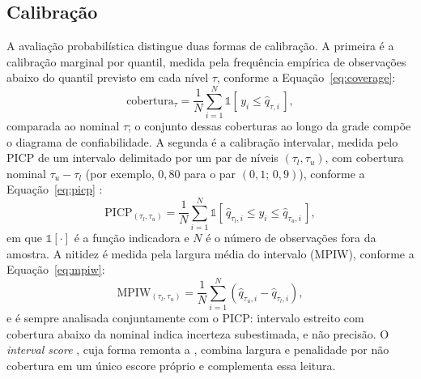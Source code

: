 \subsection{Calibração}
A avaliação probabilística distingue duas formas de calibração. A primeira é a calibração marginal por quantil, medida pela frequência empírica de observações abaixo do quantil previsto em cada nível \(\tau\), conforme a Equação~\ref{eq:coverage}:
\begin{equation}
    \mathrm{cobertura}_{\tau} = \frac{1}{N}\sum_{i=1}^{N} \mathbb{1}\!\left[\,y_{i} \leq \hat{q}_{\tau,i}\,\right],
    \label{eq:coverage}
\end{equation}
comparada ao nominal \(\tau\); o conjunto dessas coberturas ao longo da grade compõe o diagrama de confiabilidade. A segunda é a calibração intervalar, medida pelo PICP de um intervalo delimitado por um par de níveis \((\tau_l, \tau_u)\), com cobertura nominal \(\tau_u - \tau_l\) (por exemplo, \(0{,}80\) para o par \((0{,}1;\,0{,}9)\)), conforme a Equação~\ref{eq:picp} \cite{KHOSRAVI2011,PEARCE2018}:
\begin{equation}
    \mathrm{PICP}_{(\tau_l,\tau_u)} = \frac{1}{N}\sum_{i=1}^{N} \mathbb{1}\!\left[\,\hat{q}_{\tau_l,i} \leq y_{i} \leq \hat{q}_{\tau_u,i}\,\right],
    \label{eq:picp}
\end{equation}
em que \(\mathbb{1}[\cdot]\) é a função indicadora e \(N\) é o número de observações fora da amostra. A nitidez é medida pela largura média do intervalo (MPIW), conforme a Equação~\ref{eq:mpiw}:
\begin{equation}
    \mathrm{MPIW}_{(\tau_l,\tau_u)} = \frac{1}{N}\sum_{i=1}^{N} \left(\hat{q}_{\tau_u,i} - \hat{q}_{\tau_l,i}\right),
    \label{eq:mpiw}
\end{equation}
e é sempre analisada conjuntamente com o PICP: intervalo estreito com cobertura abaixo da nominal indica incerteza subestimada, e não precisão. O \textit{interval score} \cite{GNEITING2007}, cuja forma remonta a , combina largura e penalidade por não cobertura em um único escore próprio e complementa essa leitura.

